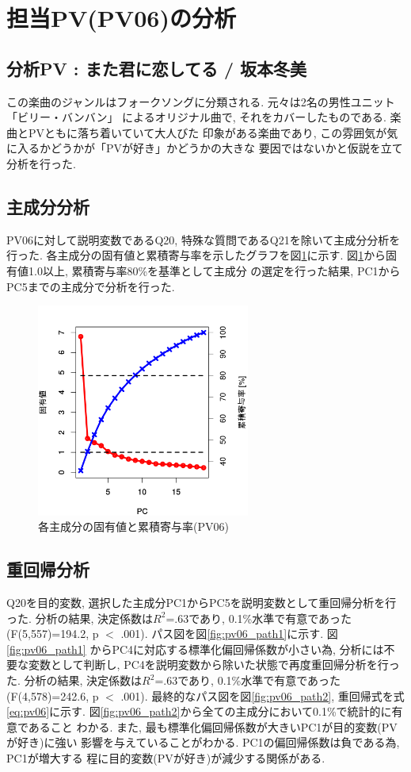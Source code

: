 \documentclass[12pt, a4j]{jsarticle}
\begin{document}
  \section{担当PV(PV06)の分析}
    \subsection{分析PV : また君に恋してる / 坂本冬美}
      この楽曲のジャンルはフォークソングに分類される. 元々は2名の男性ユニット「ビリー・バンバン」
      によるオリジナル曲で, それをカバーしたものである. 楽曲とPVともに落ち着いていて大人びた
      印象がある楽曲であり, この雰囲気が気に入るかどうかが「PVが好き」かどうかの大きな
      要因ではないかと仮説を立て分析を行った. 
    \subsection{主成分分析}
      PV06に対して説明変数であるQ20, 特殊な質問であるQ21を除いて主成分分析を行った. 
      各主成分の固有値と累積寄与率を示したグラフを図\ref{fig:pv06_eval}に示す. 
      図\ref{fig:pv06_eval}から固有値1.0以上, 累積寄与率80\%を基準として主成分
      の選定を行った結果, PC1からPC5までの主成分で分析を行った. 

      \begin{figure}[htb]
        \centering
          \includegraphics[width=7cm]{../2nd/pv06/scree.bmp}
        \caption{各主成分の固有値と累積寄与率(PV06)}
        \label{fig:pv06_eval}
      \end{figure}

    \subsection{重回帰分析}
      Q20を目的変数, 選択した主成分PC1からPC5を説明変数として重回帰分析を行った. 
      分析の結果, 決定係数は$R^2$=.63であり, 0.1\%水準で有意であった(F(5,557)=194.2, 
      p $<$ .001). パス図を図\ref{fig:pv06_path1}に示す. 図\ref{fig:pv06_path1}
      からPC4に対応する標準化偏回帰係数が小さい為, 分析には不要な変数として判断し, 
      PC4を説明変数から除いた状態で再度重回帰分析を行った. 
      分析の結果, 決定係数は$R^2$=.63であり, 0.1\%水準で有意であった(F(4,578)=242.6,
      p $<$ .001). 
      最終的なパス図を図\ref{fig:pv06_path2}, 重回帰式を式\ref{eq:pv06}に示す. 
      図\ref{fig:pv06_path2}から全ての主成分において0.1\%で統計的に有意であること
      わかる. また, 最も標準化偏回帰係数が大きいPC1が目的変数(PVが好き)に強い
      影響を与えていることがわかる. PC1の偏回帰係数は負である為, PC1が増大する
      程に目的変数(PVが好き)が減少する関係がある. 
\end{document}
